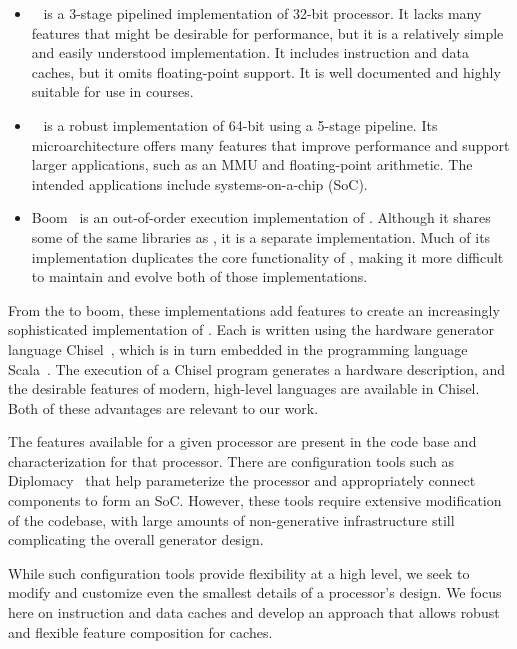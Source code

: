 \documentclass[conference]{IEEEtran}
\begin{document}
\begin{itemize}
   \item \Riscvmini{}~\cite{RvMini} is a 3-stage pipelined implementation of 32-bit \Riscv{} processor. It lacks many features that might be desirable for performance, but it is a relatively simple and easily understood implementation.  It includes instruction and data caches, but it omits floating-point support.  It is well documented and highly suitable for use in courses.
   \item \Rocketchip{}~\cite{chisel:riscv} is a robust implementation of 64-bit \Riscv{} using a 5-stage pipeline.  Its microarchitecture offers many features that improve performance and support larger applications, such as an MMU and floating-point arithmetic.  The intended applications include systems-on-a-chip (SoC).
   \item Boom~\cite{boom} is an out-of-order execution implementation of \Riscv{}. Although it shares some of the same libraries as \Rocketchip{}, it is a separate implementation.  Much of its implementation duplicates the core functionality of \Rocketchip{}, making it more difficult to maintain and evolve both of those implementations.
\end{itemize}
From the \Riscvmini{} to boom, these implementations add features to create an increasingly sophisticated implementation of \Riscv{}.  Each is written using the hardware generator language Chisel~\cite{chisel:book}, which is in turn embedded in the programming language Scala~\cite{scala-overview-tech-report}.  The execution of a Chisel program generates a hardware description, and the desirable features of modern, high-level languages are available in Chisel.  Both of these advantages are relevant to our work.

The features available for a given \Riscv{} processor are present in the code base and characterization for that processor.   There are configuration tools such as Diplomacy~\cite{diplomacy} that help parameterize the \Rocketchip{} processor and appropriately connect components to form an SoC. However, these tools require extensive modification of the codebase, with large amounts of non-generative infrastructure still complicating the overall generator design.

While such configuration tools provide flexibility at a high level, we seek to modify and customize even the smallest details of a processor's design.  We focus here on instruction and data caches and develop an approach that allows robust and flexible feature composition for caches.
\end{document}
